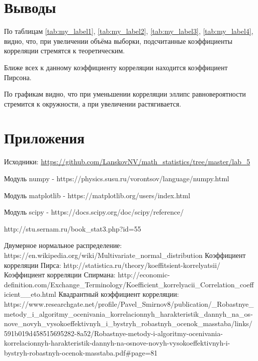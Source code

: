 \documentclass[12pt]{article}
\begin{document}
\newpage
\section{Выводы}

По таблицам \ref{tab:my_label1}, \ref{tab:my_label2}, \ref{tab:my_label3}, \ref{tab:my_label4}, видно, что, при увеличении объёма выборки, подсчитанные коэффициенты корреляции стремятся к теоретическим.

Ближе всех к данному коэффициенту корреляции находится коэффициент Пирсона.

По графикам видно, что при уменьшении корреляции эллипс равновероятности стремится к окружности, а при увеличении растягивается.

\section{Приложения}

Исходники: \url{https://github.com/LanskovNV/math_statistics/tree/master/lab_5}

\begin{thebibliography}{}
      Модуль numpy  -  https://physics.susu.ru/vorontsov/language/numpy.html
    
    Модуль matplotlib - https://matplotlib.org/users/index.html
    
    Модуль scipy - https://docs.scipy.org/doc/scipy/reference/
    
    http://stu.sernam.ru/book\_stat3.php?id=55
    
Двумерное нормальное распределение:\\  https://en.wikipedia.org/wiki/Multivariate\_normal\_distribution
Коэффициент корреляции Пирса: http://statistica.ru/theory/koeffitsient-korrelyatsii/ 
Коэффициент корреляции Спирмана: 
http://economic-definition.com/Exchange\_Terminology/Koefficient\_korrelyacii\_Correlation\_coefficient\_\_eto.html
 Квадрантный коэффициент корреляции: https://www.researchgate.net/profile/Pavel\_Smirnov8/publication/\_Robastnye\_metody\_i\_algoritmy\_ocenivania\_korrelacionnyh\_harakteristik\_dannyh\_na\_os\do-nove\_novyh\_vysokoeffektivnyh\_i\_bystryh\_robastnyh\_ocenok\_masstaba/links/591b019d458515695282\do-8a52/Robastnye-metody-i-algoritmy-ocenivania-korrelacionnyh-harakteristik-dannyh-na-osnove-novyh-vysokoeffektivnyh-i-bystryh-robastnyh-ocenok-masstaba.pdf\#page=81

\end{thebibliography}
\end{document}
